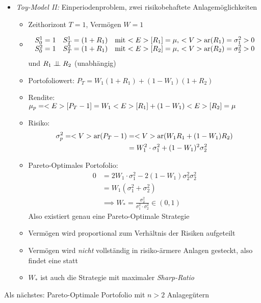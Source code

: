 \begin{itemize}
	\item \emph{Toy-Model II:} Einperiodenproblem, zwei risikobehaftete Anlagemöglichkeiten
	\begin{itemize}
		\item Zeithorizont $T=1$, Vermögen $W=1$
		\item 
		\begin{align*}
			\begin{matrix}
				S_0^1 = 1 & S_T^1 = (1+R_1) & \text{mit $<E>[R_1] = \mu$, $<V>\text{ar}(R_1) = \sigma_1^2 > 0$}\\
				S_0^2 = 1 & S_T^2 = (1+R_1) & \text{mit $<E>[R_2] = \mu$, $<V>\text{ar}(R_2) = \sigma_2^2 > 0$}
			\end{matrix}
		\end{align*}
		und $R_1 \perp\!\!\!\perp R_2$ (unabhängig)
		\item Portofoliowert: $P_T = W_1(1+R_1) + (1-W_1)(1+R_2)$
		\item Rendite: $\mu_p = <E>[P_T -1] = W_1<E>[R_1] + (1-W_1)<E>[R_2] = \mu$
		\item Risiko:
		\begin{align*}
			\sigma_p^2 = <V>\text{ar}(P_T -1) &= <V>\text{ar}(W_1 R_1 + (1-W_1)R_2)\\
			&= W^2_1\cdot \sigma_1^2 + (1-W_1)^2\sigma_2^2
		\end{align*}
		\item Pareto-Optimales Portofolio: 
		\begin{align*}
			0 &= 2W_1\cdot \sigma_1^2 - 2(1-W_1)\sigma_2^2
			\sigma_2^2\\
			&= W_1(\sigma_1^2 + \sigma_2^2)\\
			&\implies W_{\ast} = \frac{\sigma_2^2}{\sigma_1^2\cdot \sigma_2^2} \in (0,1)
		\end{align*}
		Also existiert genau eine Pareto-Optimale Strategie
		\item Vermögen wird proportional zum Verhältnis der Risiken aufgeteilt
		\item Vermögen wird \emph{nicht} vollständig in risiko-ärmere Anlagen gesteckt, also findet eine  statt
		\item $W_{\ast}$ ist auch die Strategie mit maximaler \emph{Sharp-Ratio}
	\end{itemize}
\end{itemize}
Als nächstes: Pareto-Optimale Portofolio mit $n>2$ Anlagegütern
